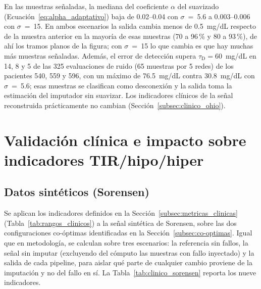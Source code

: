 \documentclass{report}
\begin{document}
En las muestras señaladas, la mediana del coeficiente $\alpha$ del suavizado (Ecuación~\ref{eq:alpha_adaptativo}) baja de 0.02--0.04 con $\sigma$~=~5.6 a 0.003--0.006 con $\sigma$~=~15. En ambos escenarios la salida cambia menos de 0.5~mg/dL respecto de la muestra anterior en la mayoría de esas muestras (70 a 96\,\% y 80 a 93\,\%), de ahí los tramos planos de la figura; con $\sigma$~=~15 lo que cambia es que hay muchas más muestras señaladas. Además, el error de detección supera $\tau_{\mathrm{D}} = 60$~mg/dL en 14, 8 y 5 de las 325 evaluaciones de ruido (65 muestras por 5 redes) de los pacientes 540, 559 y 596, con un máximo de 76.5~mg/dL contra 30.8~mg/dL con $\sigma$~=~5.6; esas muestras se clasifican como desconexión y la salida toma la estimación del imputador sin suavizar. Los indicadores clínicos de la señal reconstruida prácticamente no cambian (Sección~\ref{subsec:clinico_ohio}).

\section{Validación clínica e impacto sobre indicadores TIR/hipo/hiper}
\label{sec:validacion_clinica}

\subsection{Datos sintéticos (Sorensen)}
\label{subsec:clinico_sorensen}

Se aplican los indicadores definidos en la Sección~\ref{subsec:metricas_clinicas} (Tabla~\ref{tab:rangos_clinicos}) a la señal sintética de Sorensen, sobre las dos configuraciones co-óptimas identificadas en la Sección~\ref{subsec:co-optimas}. Igual que en metodología, se calculan sobre tres escenarios: la referencia sin fallos, la señal sin imputar (excluyendo del cómputo las muestras con fallo inyectado) y la salida de cada pipeline, para aislar qué parte de cualquier cambio proviene de la imputación y no del fallo en sí. La Tabla~\ref{tab:clinico_sorensen} reporta los nueve indicadores.
\end{document}

